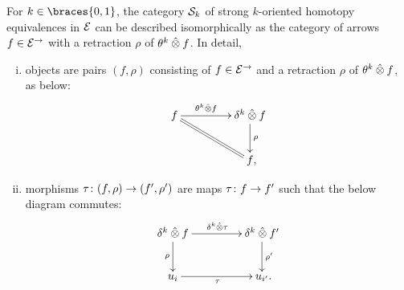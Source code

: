 \documentclass[reqno,10pt,a4paper,oneside,draft]{amsart}
\begin{document}
\begin{lemma} \label{strong-h-equiv-as-section}
For $k \in \braces{0, 1}$, the category $\cal{S}_k$ of strong $k$-oriented homotopy equivalences in $\catE$ can  be described
isomorphically as the category of arrows $f \in \catE^{\to}$ with a retraction $\rho$ of $\thetak \hatotimes f$.
In detail,
\begin{enumerate}[(i)]
\item objects are pairs $(f, \rho)$ consisting of $f \in \catE^\to$ and a retraction $\rho$ of $\thetak \hatotimes f$, as below:
\[
\xymatrix@C+2em{
  f
  \ar[r]^-{\thetak \hatotimes f}
  \ar@{=}[dr]
&
  \kcyl \hatotimes f \ar[d]^{\rho}
\\&
  f
\rlap{,}}
\]
\item morphisms $\tau \co (f, \rho) \to (f', \rho')$ are maps $\tau \co f \to f'$ such that the below diagram commutes:
\[
\xymatrix@C+2em{
  \kcyl \hatotimes f
  \ar[d]_-{\rho}
  \ar[r]^{\kcyl \hatotimes \tau}
&
 \kcyl \hatotimes f'
  \ar[d]^-{\rho'}
\\
  u_i
  \ar[r]_{\tau}
&
  u_{i'}
\rlap{.}}
\]
\end{enumerate}
\end{lemma}
\end{document}
